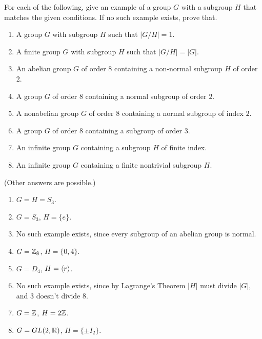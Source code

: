 \begin{exercise}
For each of the following, give an example of a group $G$ with a subgroup $H$ that matches the given conditions.  If no such example exists, prove that.

\begin{enumerate}
\item A group $G$ with subgroup $H$ such that $|G/H|=1$.
\item A finite group $G$ with subgroup $H$ such that $|G/H|=|G|$.
\item An abelian group $G$ of order $8$ containing a non-normal subgroup $H$ of order 2.
\item A group $G$ of order 8 containing a normal subgroup of order $2$.
\item A nonabelian group $G$ of order 8 containing a normal subgroup of index $2$.
\item A group $G$ of order 8 containing a subgroup of order $3$.
\item An infinite group $G$ containing a subgroup $H$ of finite index.
\item An infinite group $G$ containing a finite nontrivial subgroup $H$.
\end{enumerate}
\end{exercise}

\begin{solution}[print=true]
(Other answers are possible.)

\begin{enumerate}
\item $G=H=S_3$.
\item $G=S_3$, $H=\{e\}$.
\item No such example exists, since every subgroup of an abelian group is normal.
\item $G=\mathbb{Z}_8$, $H=\{0,4\}$.
\item $G=D_4$, $H=\langle r\rangle$.
\item No such example exists, since by Lagrange's Theorem $|H|$ must divide $|G|$, and 3 doesn't divide 8.
\item $G=\mathbb{Z}$, $H=2\mathbb{Z}$.
\item $G=GL(2,\mathbb{R})$, $H=\{\pm I_2\}$.
\end{enumerate}
\end{solution}

